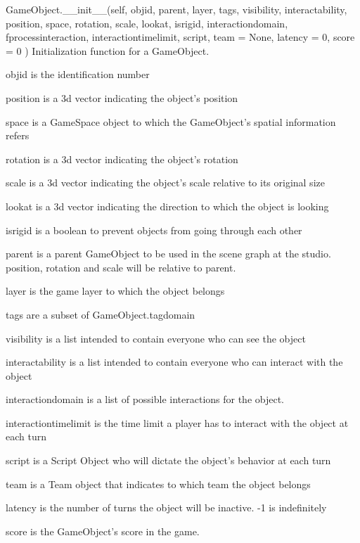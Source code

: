 \begin{DoxyVerb}GameObject.__init__(self,
      objid,
      parent,
      layer,
      tags,
      visibility,
      interactability,
      position,
      space,
      rotation,
      scale,
      lookat,
      isrigid,
      interactiondomain,
      fprocessinteraction,
      interactiontimelimit,
      script,
      team = None,
      latency  = 0,
      score = 0
     )
   Initialization function for a GameObject.
   
   objid is the identification number
   
   position is a 3d vector indicating the object's position
   
   space is a GameSpace object to which the GameObject's spatial information refers
      
   rotation is a 3d vector indicating the object's rotation
   
   scale is a 3d vector indicating the object's scale relative to its
   original size
   
   lookat is a 3d vector indicating the direction
   to which the object is looking
   
   isrigid is a boolean to prevent objects from going through each other
   
   parent is a parent GameObject to be used in the scene graph
   at the studio. position, rotation and scale will be relative to parent.
   
   layer is the game layer to which the object belongs
   
   tags are a subset of GameObject.tagdomain
   
   visibility is a list intended to contain everyone who can see the object
   
   interactability is a list intended to contain everyone
   who can interact with the object
   
   interactiondomain is a list of possible interactions for the object.
   
   interactiontimelimit is the time limit a player has to interact with
   the object at each turn
   
   script is a Script Object who will dictate the object's
   behavior at each turn
   
   team is a Team object that indicates to which team the object belongs

   latency is the number of turns the object will be inactive.
   -1 is indefinitely
   
   score is the GameObject's score in the game.
   
\end{DoxyVerb}
 

